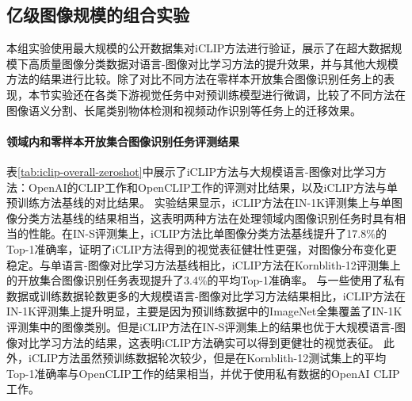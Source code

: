\subsection{亿级图像规模的组合实验}
\label{sec:iclip-22k-laion}
本组实验使用最大规模的公开数据集对iCLIP方法进行验证，展示了在超大数据规模下高质量图像分类数据对语言-图像对比学习方法的提升效果，并与其他大规模方法的结果进行比较。除了对比不同方法在零样本开放集合图像识别任务上的表现，本节实验还在各类下游视觉任务中对预训练模型进行微调，比较了不同方法在图像语义分割、长尾类别物体检测和视频动作识别等任务上的迁移效果。

\paragraph{领域内和零样本开放集合图像识别任务评测结果} 表\ref{tab:iclip-overall-zeroshot}中展示了iCLIP方法与大规模语言-图像对比学习方法：OpenAI的CLIP\cite{radford2021learning}工作和OpenCLIP\cite{openclip}工作的评测对比结果，以及iCLIP方法与单预训练方法基线的对比结果。
实验结果显示，iCLIP方法在IN-1K评测集上与单图像分类方法基线的结果相当，这表明两种方法在处理领域内图像识别任务时具有相当的性能。在IN-S评测集上，iCLIP方法比单图像分类方法基线提升了17.8\%的Top-1准确率，证明了iCLIP方法得到的视觉表征健壮性更强，对图像分布变化更稳定。与单语言-图像对比学习方法基线相比，iCLIP方法在Kornblith-12评测集上的开放集合图像识别任务表现提升了3.4\%的平均Top-1准确率。
与一些使用了私有数据或训练数据轮数更多的大规模语言-图像对比学习方法结果相比，iCLIP方法在IN-1K评测集上提升明显，主要是因为预训练数据中的ImageNet全集覆盖了IN-1K评测集中的图像类别。但是iCLIP方法在IN-S评测集上的结果也优于大规模语言-图像对比学习方法的结果，这表明iCLIP方法确实可以得到更健壮的视觉表征。
此外，iCLIP方法虽然预训练数据轮次较少，但是在Kornblith-12测试集上的平均Top-1准确率与OpenCLIP工作的结果相当，并优于使用私有数据的OpenAI CLIP\cite{radford2021learning}工作。 %


